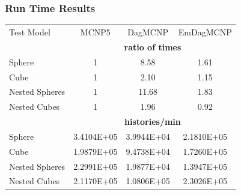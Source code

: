 \documentclass[12pt]{beamer}
\begin{document}
\begin{frame}
\frametitle{Run Time Results}

\begin{table}
  \small
  \begin{center}

      \label{timings}
    \begin{tabular}{lccc}


      \toprule
      Test Model & MCNP5 & DagMCNP & EmDagMCNP \\
      & \multicolumn{3}{c}{\textbf{ratio of times}} \\
      \hline
      Sphere & 1 & 8.58 & 1.61 \\
      Cube & 1 & 2.10 & 1.15 \\
      Nested Spheres & 1 & 11.68 & 1.83 \\
      Nested Cubes & 1 & 1.96 & 0.92 \\
      \hline
      &  \multicolumn{3}{c}{\textbf{histories/min}} \\
      \hline
      Sphere & 3.4104E+05  & 3.9944E+04  & 2.1810E+05   \\
      Cube & 1.9879E+05 & 9.4738E+04 & 1.7260E+05 \\
      Nested Spheres & 2.2991E+05 & 1.9877E+04 & 1.3947E+05 \\
      Nested Cubes & 2.1170E+05 & 1.0806E+05 & 2.3026E+05 \\
      \bottomrule

      

\end{tabular}
\end{center}
\end{table}
\end{frame}
\end{document}
